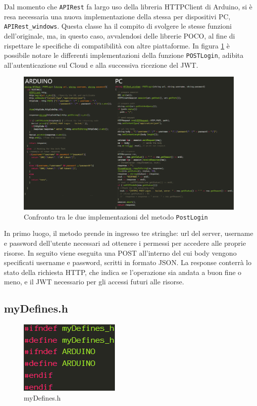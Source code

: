 Dal momento che \texttt{APIRest} fa largo uso della libreria HTTPClient di Arduino, si è resa necessaria una nuova implementazione della stessa per dispositivi PC, \texttt{APIRest\_windows}. Questa classe ha il compito di svolgere le stesse funzioni dell’originale, ma, in questo caso, avvalendosi delle librerie POCO, al fine di rispettare le specifiche di compatibilità con altre piattaforme. In figura \ref{APIRestAW} è possibile notare le differenti implementazioni della funzione \texttt{POSTLogin}, adibita all'autenticazione sul Cloud e alla successiva ricezione del JWT.

\begin{figure}[H]
	\centering
	\includegraphics[width=\linewidth]{pics/APIRestAW}
	\caption{Confronto tra le due implementazioni del metodo \texttt{PostLogin}}
	\label{APIRestAW}
\end{figure}
\newpage

In primo luogo, il metodo prende in ingresso tre stringhe: url del server, username e password dell'utente necessari ad ottenere i permessi per accedere alle proprie risorse. In seguito viene eseguita una POST all'interno del cui body vengono specificati username e password, scritti in formato JSON. La response conterrà lo stato della richiesta HTTP, che indica se l'operazione sia andata a buon fine o meno, e il JWT necessario per gli accessi futuri alle risorse.
\subsection{myDefines.h}

\begin{figure}
	\centering
	\includegraphics{pics/myDefines}
	\caption{myDefines.h}
	\label{myDefines}
\end{figure}

